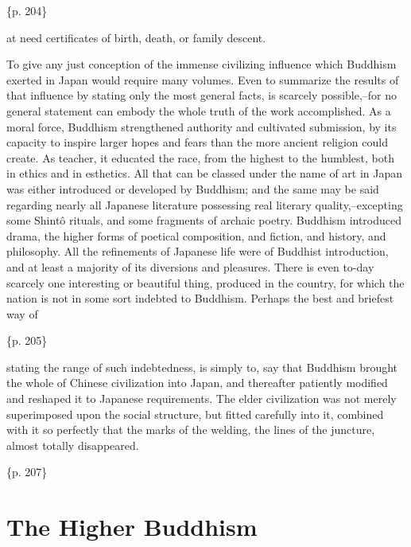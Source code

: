 \{p. 204\}

at need certificates of birth, death, or family descent.



To give any just conception of the immense civilizing influence which Buddhism exerted in Japan would require many volumes. Even to summarize the results of that influence by stating only the most general facts, is scarcely possible,--for no general statement can embody the whole truth of the work accomplished. As a moral force, Buddhism strengthened authority and cultivated submission, by its capacity to inspire larger hopes and fears than the more ancient religion could create. As teacher, it educated the race, from the highest to the humblest, both in ethics and in esthetics. All that can be classed under the name of art in Japan was either introduced or developed by Buddhism; and the same may be said regarding nearly all Japanese literature possessing real literary quality,--excepting some Shintô rituals, and some fragments of archaic poetry. Buddhism introduced drama, the higher forms of poetical composition, and fiction, and history, and philosophy. All the refinements of Japanese life were of Buddhist introduction, and at least a majority of its diversions and pleasures. There is even to-day scarcely one interesting or beautiful thing, produced in the country, for which the nation is not in some sort indebted to Buddhism. Perhaps the best and briefest way of

\{p. 205\}

stating the range of such indebtedness, is simply to, say that Buddhism brought the whole of Chinese civilization into Japan, and thereafter patiently modified and reshaped it to Japanese requirements. The elder civilization was not merely superimposed upon the social structure, but fitted carefully into it, combined with it so perfectly that the marks of the welding, the lines of the juncture, almost totally disappeared.

\{p. 207\}

\section{The Higher Buddhism}
\label{sec:orgdf69a06}

